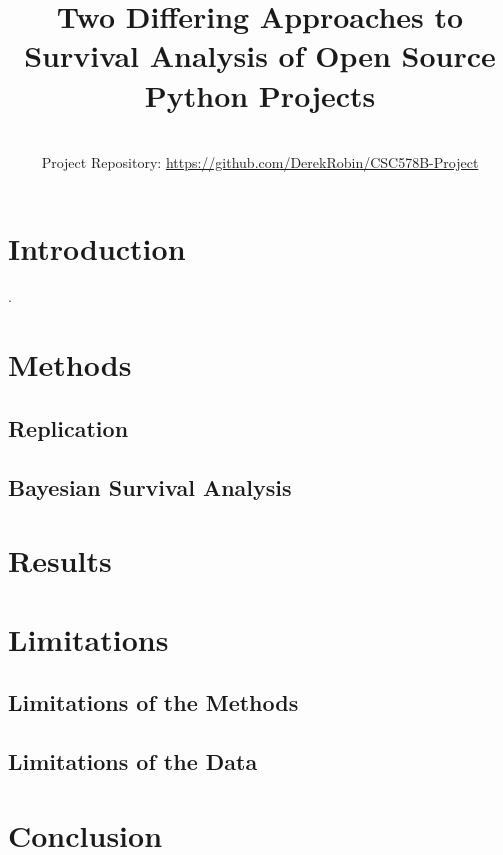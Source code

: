\documentclass[conference]{IEEEtran}
\begin{document}


\title{Two Differing Approaches to Survival Analysis of Open Source Python Projects}

\author{
 \\
Project Repository: \url{https://github.com/DerekRobin/CSC578B-Project}
}

\maketitle

\section{Introduction}

\cite{ali2020cheating}.

\section{Methods}

\subsection{Replication}

\subsection{Bayesian Survival Analysis}

\section{Results}

\section{Limitations}

\subsection{Limitations of the Methods}

\subsection{Limitations of the Data}

\section{Conclusion}



\end{document}
